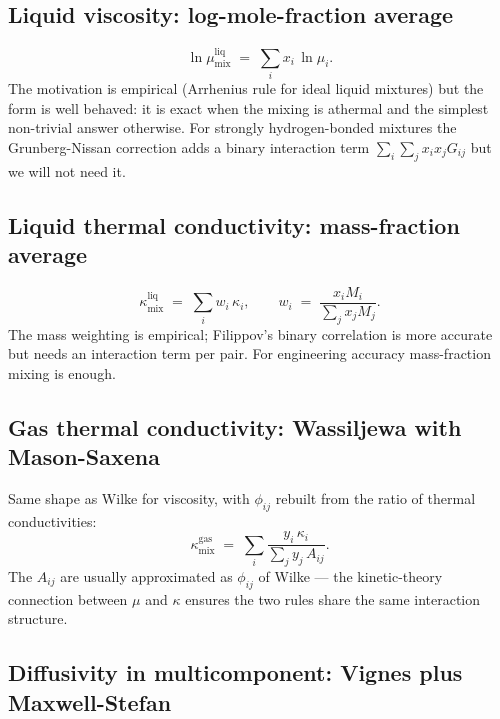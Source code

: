 \documentclass[11pt,a4paper]{article}
\begin{document}
\subsection{Liquid viscosity: log-mole-fraction average}

\begin{equation}
   \ln \mu^{\mathrm{liq}}_{\mathrm{mix}} \;=\;
     \sum_i x_i\,\ln \mu_i.
   \label{eq:liq-visc-mix}
\end{equation}
The motivation is empirical (Arrhenius rule for ideal liquid
mixtures) but the form is well behaved: it is exact when the mixing
is athermal and the simplest non-trivial answer otherwise.  For
strongly hydrogen-bonded mixtures the Grunberg-Nissan correction
adds a binary interaction term $\sum_i \sum_j x_i x_j G_{ij}$ but
we will not need it.

\subsection{Liquid thermal conductivity: mass-fraction average}

\begin{equation}
   \kappa^{\mathrm{liq}}_{\mathrm{mix}} \;=\;
     \sum_i w_i\,\kappa_i,
   \qquad w_i \;=\; \frac{x_i M_i}{\sum_j x_j M_j}.
   \label{eq:liq-kappa-mix}
\end{equation}
The mass weighting is empirical; Filippov's binary correlation is
more accurate but needs an interaction term per pair.  For
engineering accuracy mass-fraction mixing is enough.

\subsection{Gas thermal conductivity: Wassiljewa with Mason-Saxena}

Same shape as Wilke for viscosity, with
$\phi_{ij}$ rebuilt from the ratio of thermal conductivities:
\begin{equation}
   \kappa^{\mathrm{gas}}_{\mathrm{mix}} \;=\;
     \sum_i \frac{y_i\,\kappa_i}{\sum_j y_j\,A_{ij}}.
\end{equation}
The $A_{ij}$ are usually approximated as $\phi_{ij}$ of Wilke ---
the kinetic-theory connection between $\mu$ and $\kappa$ ensures the
two rules share the same interaction structure.

\subsection{Diffusivity in multicomponent: Vignes plus Maxwell-Stefan}
\end{document}
